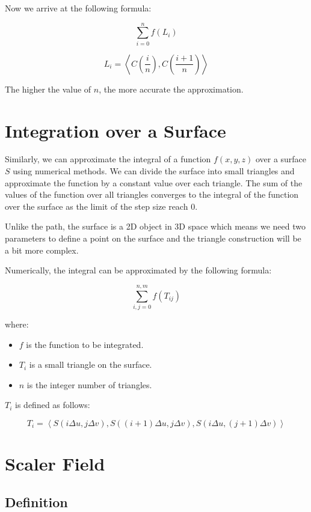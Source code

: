 \documentclass[12pt]{article}
\begin{document}
Now we arrive at the following formula:

\[
    \sum_{i=0}^{n} f\left(L_i\right)
\]

\[
    L_i = \left\langle C\left(\frac{i}{n}\right), C\left(\frac{i + 1}{n}\right)\right\rangle
\]

The higher the value of \(n\), the more accurate the approximation.

\newpage
\section{Integration over a Surface}

Similarly, we can approximate the integral of a function \(f(x, y, z)\) over a surface \(S\) using numerical methods.
We can divide the surface into small triangles and approximate the function by a constant value over each triangle.
The sum of the values of the function over all triangles converges to the integral of the function over the surface
as the limit of the step size reach 0.

Unlike the path, the surface is a 2D object in 3D space which means we need two parameters to define a point on the surface and
the triangle construction will be a bit more complex.

Numerically, the integral can be approximated by the following formula:

\[
    \sum_{i, j=0}^{n, m} f(T_{ij})
\]

where:

\begin{itemize}
    \item \(f\) is the function to be integrated.
    \item \(T_i\) is a small triangle on the surface.
    \item \(n\) is the integer number of triangles.
\end{itemize}

\(T_i\) is defined as follows:

\[
    T_i = \left\langle S\left(i \Delta u, j \Delta v\right), S\left((i + 1)\Delta u, j \Delta v\right), S\left(i \Delta u, (j + 1) \Delta v\right)\right\rangle
\]

\newpage
\section{Scaler Field}
\subsection{Definition}
\end{document}
